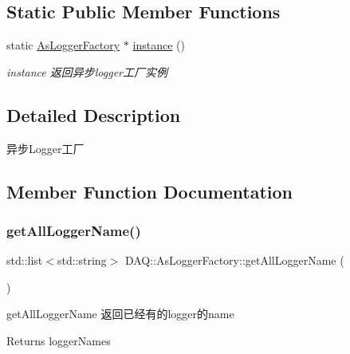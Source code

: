 \subsection*{Static Public Member Functions}
\begin{DoxyCompactItemize}
\item 
static \hyperlink{classDAQ_1_1AsLoggerFactory}{As\+Logger\+Factory} $\ast$ \hyperlink{classDAQ_1_1AsLoggerFactory_abdde728a3f51790040673fbdeb2ecf5e}{instance} ()
\begin{DoxyCompactList}\small\item\em instance 返回异步logger工厂实例 \end{DoxyCompactList}\end{DoxyCompactItemize}


\subsection{Detailed Description}
异步\+Logger工厂 

\subsection{Member Function Documentation}
\mbox{\label{classDAQ_1_1AsLoggerFactory_abf012054eb30ba4005c67c662d88b669}} 
\subsubsection{\texorpdfstring{get\+All\+Logger\+Name()}{getAllLoggerName()}}
{\footnotesize\ttfamily std\+::list$<$std\+::string$>$ D\+A\+Q\+::\+As\+Logger\+Factory\+::get\+All\+Logger\+Name (\begin{DoxyParamCaption}{ }\end{DoxyParamCaption})}



get\+All\+Logger\+Name 返回已经有的logger的name 

\begin{DoxyReturn}{Returns}
logger\+Names 
\end{DoxyReturn}
\mbox{\label{classDAQ_1_1AsLoggerFactory_aec800700a5d059c0f10574bf2fdd5784}} 
